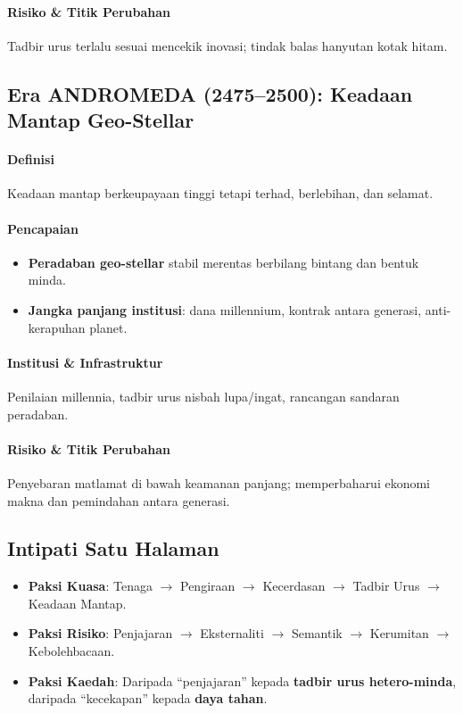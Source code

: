 \documentclass[11pt]{article}
\begin{document}
\paragraph{Risiko \& Titik Perubahan} Tadbir urus terlalu sesuai mencekik inovasi; tindak balas hanyutan kotak hitam.

\subsection{Era ANDROMEDA (2475–2500): Keadaan Mantap Geo-Stellar}
\paragraph{Definisi} Keadaan mantap berkeupayaan tinggi tetapi terhad, berlebihan, dan selamat.

\paragraph{Pencapaian}
\begin{itemize}[noitemsep]
  \item \textbf{Peradaban geo-stellar} stabil merentas berbilang bintang dan bentuk minda.
  \item \textbf{Jangka panjang institusi}: dana millennium, kontrak antara generasi, anti-kerapuhan planet.
\end{itemize}

\paragraph{Institusi \& Infrastruktur} Penilaian millennia, tadbir urus nisbah lupa/ingat, rancangan sandaran peradaban.

\paragraph{Risiko \& Titik Perubahan} Penyebaran matlamat di bawah keamanan panjang; memperbaharui ekonomi makna dan pemindahan antara generasi.

\subsection{Intipati Satu Halaman}
\begin{itemize}[noitemsep]
  \item \textbf{Paksi Kuasa}: Tenaga $\rightarrow$ Pengiraan $\rightarrow$ Kecerdasan $\rightarrow$ Tadbir Urus $\rightarrow$ Keadaan Mantap.
  \item \textbf{Paksi Risiko}: Penjajaran $\rightarrow$ Eksternaliti $\rightarrow$ Semantik $\rightarrow$ Kerumitan $\rightarrow$ Kebolehbacaan.
  \item \textbf{Paksi Kaedah}: Daripada ``penjajaran'' kepada \textbf{tadbir urus hetero-minda}, daripada ``kecekapan'' kepada \textbf{daya tahan}.
\end{itemize}
\end{document}
